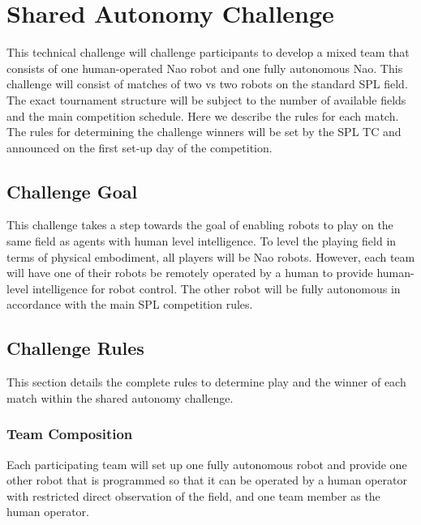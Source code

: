 \section{Shared Autonomy Challenge}

This technical challenge will challenge participants to develop a mixed team that consists of one human-operated Nao robot and one fully autonomous Nao. This challenge will consist of matches of two vs two robots on the standard SPL field. The exact tournament structure will be subject to the number of available fields and the main competition schedule. Here we describe the rules for each match. The rules for determining the challenge winners will be set by the SPL TC and announced on the first set-up day of the competition.

\subsection{Challenge Goal}

This challenge takes a step towards the goal of enabling robots to play on the same field as agents with human level intelligence. To level the playing field in terms of physical embodiment, all players will be Nao robots. However, each team will have one of their robots be remotely operated by a human to provide human-level intelligence for robot control. The other robot will be fully autonomous in accordance with the main SPL competition rules.

\subsection{Challenge Rules}

This section details the complete rules to determine play and the winner of each match within the shared autonomy challenge.

\subsubsection{Team Composition}
Each participating team will set up one fully autonomous robot and provide one other robot that is programmed so that it can be operated by a human operator with restricted direct observation of the field, and one team member as the human operator.

